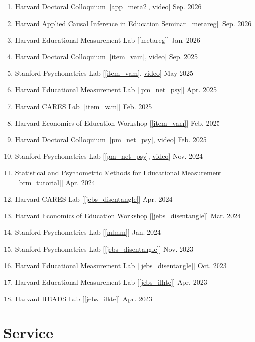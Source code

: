 \documentclass[11pt]{article}
\begin{document}
\begin{enumerate}
    \item Harvard Doctoral Colloquium [\ref{app_meta2}, \href{https://youtu.be/LDdCavcFYj0}{video}] \hfill Sep. 2026
    \item Harvard Applied Causal Inference in Education Seminar [\ref{metareg}] \hfill Sep. 2026
    \item Harvard Educational Measurement Lab [\ref{metareg}] \hfill Jan. 2026
    \item Harvard Doctoral Colloquium [\ref{item_vam}, \href{https://www.youtube.com/watch?v=Ll7zLhHDquw}{video}] \hfill Sep. 2025
    \item Stanford Psychometrics Lab [\ref{item_vam}, \href{https://youtu.be/fRweFpub5q0}{video}] \hfill May 2025
    \item Harvard Educational Measurement Lab [\ref{pm_net_psy}] \hfill Apr. 2025
    \item Harvard CARES Lab [\ref{item_vam}] \hfill Feb. 2025
    \item Harvard Economics of Education Workshop [\ref{item_vam}] \hfill Feb. 2025
    \item Harvard Doctoral Colloquium [\ref{pm_net_psy}, \href{https://www.youtube.com/watch?v=9IOWOtSvnvs}{video}] \hfill Feb. 2025
    \item Stanford Psychometrics Lab [\ref{pm_net_psy}, \href{https://www.youtube.com/watch?v=8VPFNCZj1sQ}{video}] \hfill Nov. 2024
    \item Statistical and Psychometric Methods for Educational Measurement [\ref{brm_tutorial}] \hfill Apr. 2024
    \item Harvard CARES Lab [\ref{jebs_disentangle}] \hfill Apr. 2024
    \item Harvard Economics of Education Workshop [\ref{jebs_disentangle}] \hfill Mar. 2024
    \item Stanford Psychometrics Lab [\ref{mlmm}] \hfill Jan. 2024
    \item Stanford Psychometrics Lab [\ref{jebs_disentangle}] \hfill Nov. 2023
    \item Harvard Educational Measurement Lab [\ref{jebs_disentangle}] \hfill Oct. 2023
    \item Harvard Educational Measurement Lab [\ref{jebs_ilhte}] \hfill Apr. 2023
    \item Harvard READS Lab [\ref{jebs_ilhte}] \hfill Apr. 2023

\end{enumerate}

\section{Service}
\end{document}
